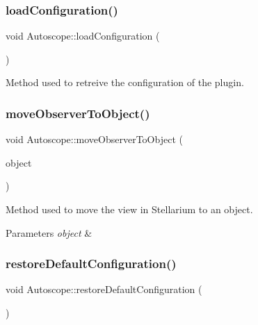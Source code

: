 \subsubsection{\texorpdfstring{loadConfiguration()}{loadConfiguration()}}
{\footnotesize\ttfamily void Autoscope\+::load\+Configuration (\begin{DoxyParamCaption}{ }\end{DoxyParamCaption})}



Method used to retreive the configuration of the plugin. 

\mbox{\label{class_autoscope_ac8f9e09385739a5ba5ed460c83ec88df}} 
\subsubsection{\texorpdfstring{moveObserverToObject()}{moveObserverToObject()}}
{\footnotesize\ttfamily void Autoscope\+::move\+Observer\+To\+Object (\begin{DoxyParamCaption}\item[{Stel\+ObjectP}]{object }\end{DoxyParamCaption})}



Method used to move the view in Stellarium to an object. 


\begin{DoxyParams}{Parameters}
{\em object} & \\
\hline
\end{DoxyParams}
\mbox{\label{class_autoscope_a2c5424afe3270c6069e0109834dd52b5}} 
\subsubsection{\texorpdfstring{restoreDefaultConfiguration()}{restoreDefaultConfiguration()}}
{\footnotesize\ttfamily void Autoscope\+::restore\+Default\+Configuration (\begin{DoxyParamCaption}{ }\end{DoxyParamCaption})}



